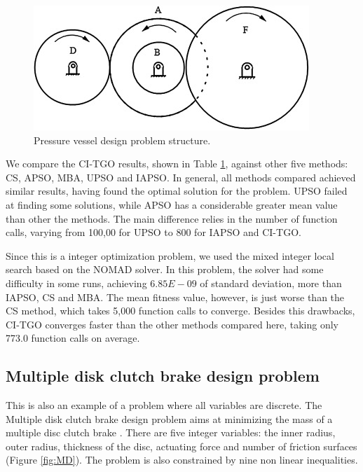 \begin{figure}[h]
\begin{center}
\includegraphics[scale=0.6]{Imgs/GT.jpg}
\end{center}
\captionsetup{justification=centering}
\caption{Pressure vessel design problem structure.}\label{fig:GT}
\end{figure}


We compare the CI-TGO results, shown in Table \ref{fig:GT}, against other five methods: CS, APSO, MBA, UPSO and IAPSO. In general, all methods compared achieved similar results, having found the optimal solution for the problem. UPSO failed at finding some solutions, while APSO has a considerable greater mean value than other the methods.
The main difference relies in the number of function calls, varying from 100,00 for UPSO to 800 for IAPSO and CI-TGO.




Since this is a integer optimization problem, we used the mixed integer local search based on the NOMAD solver. In this problem, the solver had some difficulty in some runs, achieving $6.85E \! - \! 09$ of standard deviation, more than IAPSO, CS and MBA. The mean fitness value, however, is just worse than the CS method, which takes 5,000 function calls to converge. Besides this drawbacks, CI-TGO converges faster than the other methods compared here, taking only 773.0 function calls on average.



\subsection{Multiple disk clutch brake design problem}

This is also an example of a problem where all variables are discrete. The Multiple disk clutch brake design problem aims at minimizing the mass of a multiple disc clutch brake \cite{MD}. There are five integer variables: the inner radius, outer radius, thickness of the disc, actuating force and number of friction surfaces (Figure \ref{fig:MD}). The problem is also constrained by nine non linear inequalities.

